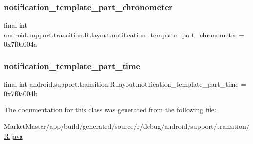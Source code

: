 \subsubsection{\texorpdfstring{notification\+\_\+template\+\_\+part\+\_\+chronometer}{notification\_template\_part\_chronometer}}
{\footnotesize\ttfamily final int android.\+support.\+transition.\+R.\+layout.\+notification\+\_\+template\+\_\+part\+\_\+chronometer = 0x7f0a004a\hspace{0.3cm}{\ttfamily [static]}}

\mbox{\label{classandroid_1_1support_1_1transition_1_1R_1_1layout_aa67b5ed098ab3763d52f82b3e2edd7b3}} 
\subsubsection{\texorpdfstring{notification\+\_\+template\+\_\+part\+\_\+time}{notification\_template\_part\_time}}
{\footnotesize\ttfamily final int android.\+support.\+transition.\+R.\+layout.\+notification\+\_\+template\+\_\+part\+\_\+time = 0x7f0a004b\hspace{0.3cm}{\ttfamily [static]}}



The documentation for this class was generated from the following file\+:\begin{DoxyCompactItemize}
\item 
Market\+Master/app/build/generated/source/r/debug/android/support/transition/\mbox{\hyperlink{debug_2android_2support_2transition_2R_8java}{R.\+java}}\end{DoxyCompactItemize}
